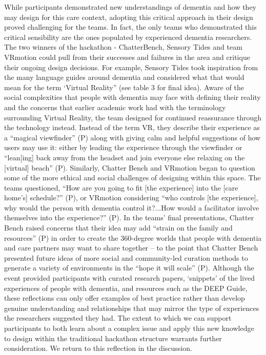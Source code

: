 While participants demonstrated new understandings of dementia and how they may design for this care context, adopting this critical approach in their design proved challenging for the teams. In fact, the only teams who demonstrated this critical sensibility are the ones populated by experienced dementia researchers. The two winners of the hackathon - ChatterBench, Sensory Tides and team VRmotion could pull from their successes and failures in the area and critique their ongoing design decisions. For example, Sensory Tides took inspiration from the many language guides around dementia and considered what that would mean for the term ‘Virtual Reality” (see table 3 for final idea). Aware of the social complexities that people with dementia may face with defining their reality and the concerns that earlier academic work had with the terminology surrounding Virtual Reality, the team designed for continued reassurance through the technology instead. Instead of the term VR, they describe their experience as a “magical viewfinder” (P) along with giving calm and helpful suggestions of how users may use it: either by leading the experience through the viewfinder or “lean[ing] back away from the headset and join everyone else relaxing on the [virtual] beach” (P). Similarly, Chatter Bench and VRmotion began to question some of the more ethical and social challenges of designing within this space. The teams questioned, “How are you going to fit [the experience] into the [care home’s] schedule?” (P), or VRmotion considering “who controls [the experience], why would the person with dementia control it?...How would a facilitator involve themselves into the experience?” (P). In the teams’ final presentations, Chatter Bench raised concerns that their idea may add “strain on the family and resources” (P) in order to create the 360-degree worlds that people with dementia and care partners may want to share together – to the point that Chatter Bench presented future ideas of more social and community-led curation methods to generate a variety of environments in the “hope it will scale” (P). Although the event provided participants with curated research papers, ‘snippets’ of the lived experiences of people with dementia, and resources such as the DEEP Guide, these reflections can only offer examples of best practice rather than develop genuine understanding and relationships that may mirror the type of experiences the researchers suggested they had.  The extent to which we can support participants to both learn about a complex issue and apply this new knowledge to design within the traditional hackathon structure warrants further consideration. We return to this reflection in the discussion. 
